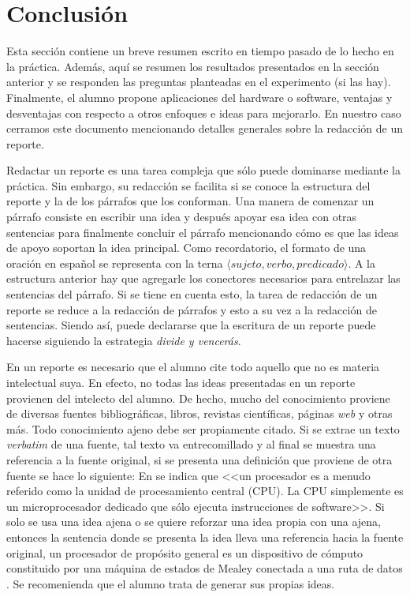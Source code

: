 \documentclass[12pt]{article}
\begin{document}
\section{Conclusión}\label{sec:conclusion}

Esta sección contiene un breve resumen escrito en tiempo pasado de lo hecho en 
la práctica. Además, aquí se resumen los resultados presentados en la sección 
anterior y se responden las preguntas planteadas en el experimento 
(si las hay). Finalmente, el alumno propone aplicaciones del hardware o 
software, ventajas y desventajas con respecto a otros enfoques e ideas para 
mejorarlo. En nuestro caso cerramos este documento mencionando detalles 
generales sobre la redacción de un reporte.

Redactar un reporte es una tarea compleja que sólo puede dominarse mediante la 
práctica. Sin embargo, su redacción se facilita si se conoce la estructura del 
reporte y la de los párrafos que los conforman. Una manera de comenzar un 
párrafo consiste en escribir una idea y después apoyar esa idea con otras 
sentencias para finalmente concluir el párrafo mencionando cómo es que las 
ideas de apoyo soportan la idea principal. Como recordatorio, el formato de 
una oración en español se representa con la terna 
$\langle sujeto,verbo,predicado \rangle$. A la estructura anterior hay que 
agregarle los conectores necesarios para entrelazar las sentencias del párrafo. 
Si se tiene en cuenta esto, la tarea de redacción de un reporte se reduce a la 
redacción de párrafos y esto a su vez a la redacción de sentencias. Siendo así, 
puede declararse que la escritura de un reporte puede hacerse siguiendo la 
estrategia \textit{divide y vencerás}.

En un reporte es necesario que el alumno cite todo aquello que no es materia 
intelectual suya. En efecto, no todas las ideas presentadas en un reporte 
provienen del intelecto del alumno. De hecho, mucho del conocimiento proviene 
de diversas fuentes bibliográficas, \eg libros, revistas científicas, 
páginas \textit{web} y otras más. Todo conocimiento ajeno debe ser propiamente 
citado. Si se extrae un texto \textit{verbatim} de una fuente, tal texto va 
entrecomillado y al final se muestra una referencia a la fuente original, \eg 
si se presenta una definición que proviene de otra fuente se hace lo siguiente: 
En \cite{HwEn05} se indica que <<un procesador es a menudo referido como la 
unidad de procesamiento central (CPU). La CPU simplemente es un microprocesador 
dedicado que sólo ejecuta instrucciones de software>>. Si solo se usa una idea 
ajena o se quiere reforzar una idea propia con una ajena, entonces la sentencia 
donde se presenta la idea lleva una referencia hacia la fuente original, \eg 
un procesador de propósito general es un dispositivo de cómputo constituido por 
una máquina de estados de Mealey conectada a una ruta de datos 
\cite{HwEn05,MuMi07,StWi13}. Se recomenienda que el alumno trata de generar sus 
propias ideas.
\end{document}
